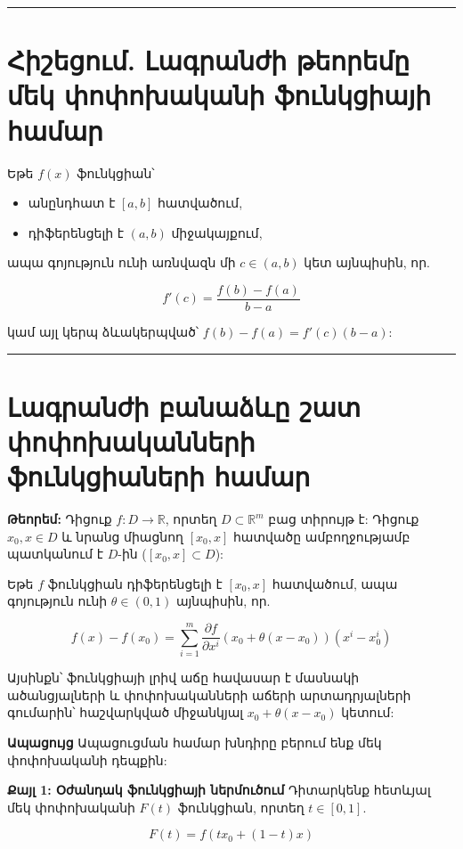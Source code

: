 \documentclass[12pt, a4paper]{article}
\begin{document}
\tableofcontents
\vspace{2em}
\hrule
\vspace{2em}

\section{Հիշեցում. Լագրանժի թեորեմը մեկ փոփոխականի ֆունկցիայի համար}

Եթե $f(x)$ ֆունկցիան՝

\begin{itemize}
    \item անընդհատ է $[a, b]$ հատվածում,
    \item դիֆերենցելի է $(a, b)$ միջակայքում,
\end{itemize}

ապա գոյություն ունի առնվազն մի $c \in (a, b)$ կետ այնպիսին, որ.

$$f'(c) = \frac{f(b) - f(a)}{b - a}$$

կամ այլ կերպ ձևակերպված՝ $f(b) - f(a) = f'(c)(b - a)$:

\vspace{1em}
\hrule
\vspace{1em}

\section{Լագրանժի բանաձևը շատ փոփոխականների ֆունկցիաների համար}

\textbf{Թեորեմ:} Դիցուք $f: D \to \mathbb{R}$, որտեղ $D \subset \mathbb{R}^m$ բաց տիրույթ է: Դիցուք $x_0, x \in D$ և նրանց միացնող $[x_0, x]$ հատվածը ամբողջությամբ պատկանում է $D$-ին ($[x_0, x] \subset D$):

Եթե $f$ ֆունկցիան դիֆերենցելի է $[x_0, x]$ հատվածում, ապա գոյություն ունի $\theta \in (0, 1)$ այնպիսին, որ.

$$f(x) - f(x_0) = \sum_{i=1}^{m} \frac{\partial f}{\partial x^i} (x_0 + \theta(x - x_0)) (x^i - x_0^i)$$

Այսինքն՝ ֆունկցիայի լրիվ աճը հավասար է մասնակի ածանցյալների և փոփոխականների աճերի արտադրյալների գումարին՝ հաշվարկված միջանկյալ $x_0 + \theta(x - x_0)$ կետում:

\textbf{Ապացույց}
Ապացուցման համար խնդիրը բերում ենք մեկ փոփոխականի դեպքին:

\textbf{Քայլ 1: Օժանդակ ֆունկցիայի ներմուծում}
Դիտարկենք հետևյալ մեկ փոփոխականի $F(t)$ ֆունկցիան, որտեղ $t \in [0, 1]$.

$$F(t) = f(t x_0 + (1 - t) x)$$
\end{document}
